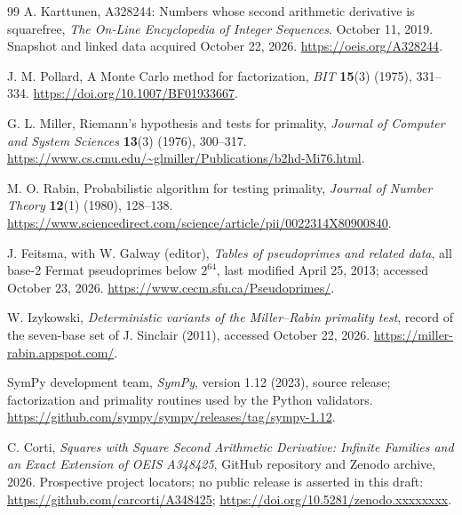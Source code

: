 \documentclass[11pt]{article}
\theoremstyle{definition}
\theoremstyle{remark}
\begin{document}
\begin{thebibliography}{99}
A. Karttunen, A328244: Numbers whose second arithmetic derivative is squarefree,
\textit{The On-Line Encyclopedia of Integer Sequences}.
October 11, 2019.
Snapshot and linked data acquired October 22, 2026.
\url{https://oeis.org/A328244}.

J. M. Pollard, A Monte Carlo method for factorization,
\textit{BIT} \textbf{15}(3) (1975), 331--334.
\url{https://doi.org/10.1007/BF01933667}.

G. L. Miller, Riemann's hypothesis and tests for primality,
\textit{Journal of Computer and System Sciences} \textbf{13}(3)
(1976), 300--317.
\url{https://www.cs.cmu.edu/~glmiller/Publications/b2hd-Mi76.html}.

M. O. Rabin, Probabilistic algorithm for testing primality,
\textit{Journal of Number Theory} \textbf{12}(1) (1980), 128--138.
\url{https://www.sciencedirect.com/science/article/pii/0022314X80900840}.

J. Feitsma, with W. Galway (editor), \textit{Tables of pseudoprimes
and related data}, all base-2 Fermat pseudoprimes below $2^{64}$,
last modified April 25, 2013; accessed October 23, 2026.
\url{https://www.cecm.sfu.ca/Pseudoprimes/}.

W. Izykowski, \textit{Deterministic variants of the Miller--Rabin
primality test}, record of the seven-base set of J. Sinclair (2011),
accessed October 22, 2026.
\url{https://miller-rabin.appspot.com/}.

SymPy development team, \textit{SymPy}, version 1.12 (2023),
source release; factorization and primality routines used by the Python
validators. \url{https://github.com/sympy/sympy/releases/tag/sympy-1.12}.

C. Corti, \textit{Squares with Square Second Arithmetic Derivative:
Infinite Families and an Exact Extension of OEIS A348425},
GitHub repository and Zenodo archive, 2026.
Prospective project locators; no public release is asserted in this draft:
\url{https://github.com/carcorti/A348425};
\url{https://doi.org/10.5281/zenodo.xxxxxxxx}.
\end{thebibliography}
\end{document}
